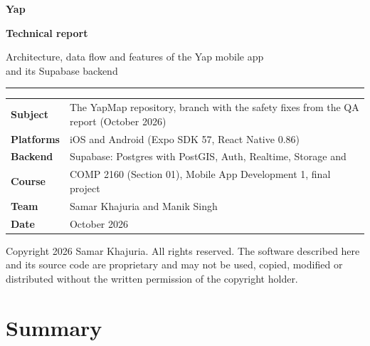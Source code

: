 
\begin{titlepage}
  \thispagestyle{empty}
  \vspace*{30mm}
  {\sffamily\bfseries\fontsize{40}{44}\selectfont\color{accent}Yap\par}
  \vspace{6mm}
  {\sffamily\bfseries\LARGE Technical report\par}
  \vspace{4mm}
  {\sffamily\large\color{muted}Architecture, data flow and features of the Yap mobile app\\and its Supabase backend\par}
  \vspace{10mm}
  {\color{accent}\rule{28mm}{1.2pt}\par}
  \vspace{10mm}
  {\small
  \begin{tabular}{@{}L{34mm}L{100mm}@{}}
    \textsf{\textbf{Subject}} & The YapMap repository, branch  with the safety fixes from the QA report (October 2026) \\
    \textsf{\textbf{Platforms}} & iOS and Android (Expo SDK 57, React Native 0.86) \\
    \textsf{\textbf{Backend}} & Supabase: Postgres with PostGIS, Auth, Realtime, Storage and  \\
    \textsf{\textbf{Course}} & COMP 2160 (Section 01), Mobile App Development 1, final project \\
    \textsf{\textbf{Team}} & Samar Khajuria and Manik Singh \\
    \textsf{\textbf{Date}} & October 2026 \\
  \end{tabular}\par}
  \vfill
  {\footnotesize\color{muted}
  Copyright \textcopyright{} 2026 Samar Khajuria. All rights reserved. The software described here and its
  source code are proprietary and may not be used, copied, modified or distributed without the written
  permission of the copyright holder.\par}
\end{titlepage}

\chapter*{Summary}

